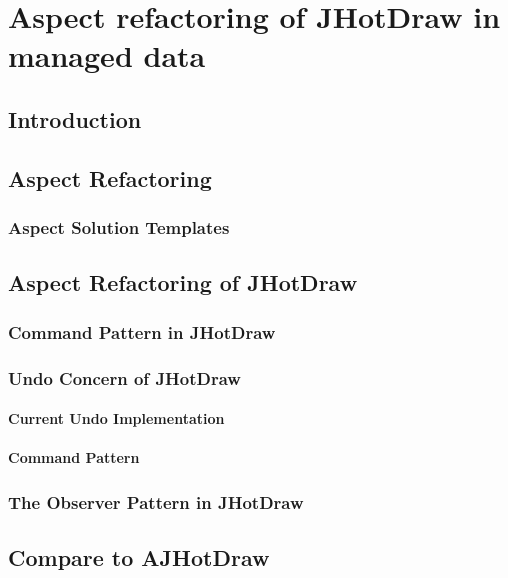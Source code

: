 
\chapter{Aspect refactoring of JHotDraw in managed data}\label{AspectRefactoring}

\section{Introduction}

\section{Aspect Refactoring}

\subsection{Aspect Solution Templates}

\section{Aspect Refactoring of JHotDraw}

\subsection{Command Pattern in JHotDraw}\label{Command Pattern in JHotDraw}

\subsection{Undo Concern of JHotDraw}\label{Undo JHotDraw}

\subsubsection{Current Undo Implementation}



\subsubsection{Command Pattern}

\subsection{The Observer Pattern in JHotDraw}\label{The Observer Pattern in JHotDraw}


\section{Compare to AJHotDraw}